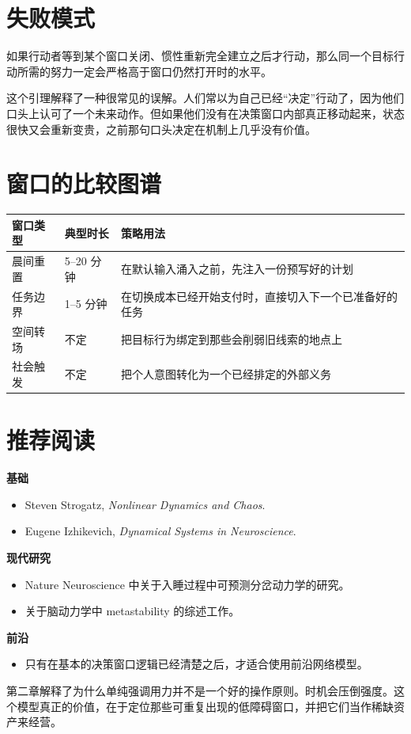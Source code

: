 \section{失败模式}

\begin{lemma}[延迟响应失败]
如果行动者等到某个窗口关闭、惯性重新完全建立之后才行动，那么同一个目标行动所需的努力一定会严格高于窗口仍然打开时的水平。
\end{lemma}

\begin{discussion}
这个引理解释了一种很常见的误解。人们常以为自己已经“决定”行动了，因为他们口头上认可了一个未来动作。但如果他们没有在决策窗口内部真正移动起来，状态很快又会重新变贵，之前那句口头决定在机制上几乎没有价值。
\end{discussion}

\section{窗口的比较图谱}

\begin{center}
\begin{tabularx}{\textwidth}{@{}l l X@{}}
\toprule
窗口类型 & 典型时长 & 策略用法 \\
\midrule
晨间重置 & 5--20 分钟 & 在默认输入涌入之前，先注入一份预写好的计划 \\
任务边界 & 1--5 分钟 & 在切换成本已经开始支付时，直接切入下一个已准备好的任务 \\
空间转场 & 不定 & 把目标行为绑定到那些会削弱旧线索的地点上 \\
社会触发 & 不定 & 把个人意图转化为一个已经排定的外部义务 \\
\bottomrule
\end{tabularx}
\end{center}

\section{推荐阅读}

\begin{readingbox}
\textbf{基础}
\begin{itemize}[nosep]
  \item Steven Strogatz, \emph{Nonlinear Dynamics and Chaos}.
  \item Eugene Izhikevich, \emph{Dynamical Systems in Neuroscience}.
\end{itemize}
\textbf{现代研究}
\begin{itemize}[nosep]
  \item Nature Neuroscience 中关于入睡过程中可预测分岔动力学的研究。
  \item 关于脑动力学中 metastability 的综述工作。
\end{itemize}
\textbf{前沿}
\begin{itemize}[nosep]
  \item 只有在基本的决策窗口逻辑已经清楚之后，才适合使用前沿网络模型。
\end{itemize}
\end{readingbox}

\begin{summarybox}
第二章解释了为什么单纯强调用力并不是一个好的操作原则。时机会压倒强度。这个模型真正的价值，在于定位那些可重复出现的低障碍窗口，并把它们当作稀缺资产来经营。
\end{summarybox}
